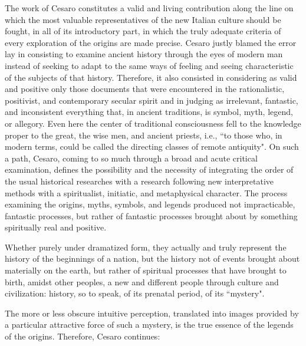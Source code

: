 The work of Cesaro constitutes a valid and living contribution along the line on which the most valuable representatives of the new Italian culture should be fought, in all of its introductory part, in which the truly adequate criteria of every exploration of the origins are made precise. Cesaro justly blamed the error lay in consisting to examine ancient history through the eyes of modern man instead of seeking to adapt to the same ways of feeling and seeing characteristic of the subjects of that history. Therefore, it also consisted in considering as valid and positive only those documents that were encountered in the rationalistic, positivist, and contemporary secular spirit and in judging as irrelevant, fantastic, and inconsistent everything that, in ancient traditions, is symbol, myth, legend, or allegory. Even here the center of traditional consciousness fell to the knowledge proper to the great, the wise men, and ancient priests, i.e., ``to those who, in modern terms, could be called the directing classes of remote antiquity". On such a path, Cesaro, coming to so much through a broad and acute critical examination, defines the possibility and the necessity of integrating the order of the usual historical researches with a research following new interpretative methods with a spiritualist, initiatic, and metaphysical character. The process examining the origins, myths, symbols, and legends produced not impracticable, fantastic processes, but rather of fantastic processes brought about by something spiritually real and positive.

\begin{quotex}
Whether purely under dramatized form, they actually and truly represent the history of the beginnings of a nation, but the history not of events brought about materially on the earth, but rather of spiritual processes that have brought to birth, amidst other peoples, a new and different people through culture and civilization: history, so to speak, of its prenatal period, of its ``mystery". 

\end{quotex}
The more or less obscure intuitive perception, translated into images provided by a particular attractive force of such a mystery, is the true essence of the legends of the origins. Therefore, Cesaro continues:

